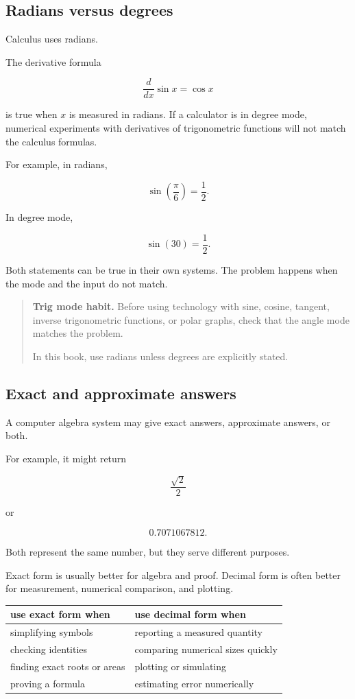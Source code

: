 \subsection{Radians versus degrees}
\label{appsubsec:radians-vs-degrees}

Calculus uses radians.

The derivative formula

\[
\frac{d}{dx}\sin x=\cos x
\]

is true when \(x\) is measured in radians.  If a calculator is in degree mode, numerical
experiments with derivatives of trigonometric functions will not match the calculus
formulas.

For example, in radians,

\[
\sin\left(\frac{\pi}{6}\right)=\frac12.
\]

In degree mode,

\[
\sin(30)=\frac12.
\]

Both statements can be true in their own systems.  The problem happens when the mode
and the input do not match.

\begin{quote}
\textbf{Trig mode habit.}
Before using technology with sine, cosine, tangent, inverse trigonometric functions,
or polar graphs, check that the angle mode matches the problem.

In this book, use radians unless degrees are explicitly stated.
\end{quote}

\subsection{Exact and approximate answers}
\label{appsubsec:exact-approximate-cas}

A computer algebra system may give exact answers, approximate answers, or both.

For example, it might return

\[
\frac{\sqrt2}{2}
\]

or

\[
0.7071067812.
\]

Both represent the same number, but they serve different purposes.

Exact form is usually better for algebra and proof.  Decimal form is often better for
measurement, numerical comparison, and plotting.

\begin{center}
\renewcommand{\arraystretch}{1.5}
\begin{tabular}{p{}|p{}}
\textbf{use exact form when} & \textbf{use decimal form when} \\ \hline
simplifying symbols & reporting a measured quantity \\
checking identities & comparing numerical sizes quickly \\
finding exact roots or areas & plotting or simulating \\
proving a formula & estimating error numerically
\end{tabular}
\end{center}


